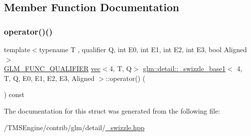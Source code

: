 \subsection{Member Function Documentation}
\mbox{\label{structglm_1_1detail_1_1__swizzle__base1_3_014_00_01_t_00_01_q_00_01_e0_00_01_e1_00_01_e2_00_01_e3_00_01_aligned_01_4_a4f7066f4879ee4e9a999748d556c9198}} 
\subsubsection{\texorpdfstring{operator()()}{operator()()}}
{\footnotesize\ttfamily template$<$typename T , qualifier Q, int E0, int E1, int E2, int E3, bool Aligned$>$ \\
\hyperlink{setup_8hpp_a33fdea6f91c5f834105f7415e2a64407}{G\+L\+M\+\_\+\+F\+U\+N\+C\+\_\+\+Q\+U\+A\+L\+I\+F\+I\+ER} \hyperlink{structglm_1_1vec}{vec}$<$4, T, Q$>$ \hyperlink{structglm_1_1detail_1_1__swizzle__base1}{glm\+::detail\+::\+\_\+swizzle\+\_\+base1}$<$ 4, T, Q, E0, E1, E2, E3, Aligned $>$\+::operator() (\begin{DoxyParamCaption}{ }\end{DoxyParamCaption}) const\hspace{0.3cm}{\ttfamily [inline]}}



The documentation for this struct was generated from the following file\+:\begin{DoxyCompactItemize}
\item 
/\+T\+M\+S\+Engine/contrib/glm/detail/\hyperlink{__swizzle_8hpp}{\+\_\+swizzle.\+hpp}\end{DoxyCompactItemize}
